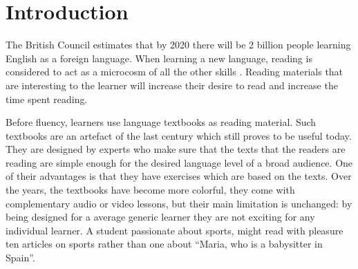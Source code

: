 
\section{Introduction}
The British Council estimates that by 2020 there will be 2 billion people learning English as a foreign language. When learning a new language, reading is considered to act as a microcosm of all the other skills \cite{mccarthy1999-microcosm}. Reading materials that are interesting to the learner will increase their desire to read and increase the time spent reading.  


Before fluency, learners use language textbooks as reading material. Such textbooks are an artefact of the last century which still proves to be useful today. They are designed by experts who make sure that the texts that the readers are reading are simple enough for the desired language level of a broad audience. One of their advantages is that they have exercises which are based on the texts. Over the years, the textbooks have become more colorful, they come with complementary audio or video lessons, but their main limitation is unchanged: 
by being designed for a average generic learner they are not exciting for any individual learner. A student passionate about sports, might read with pleasure ten articles on sports rather than one about ``Maria, who is a babysitter in Spain''. 

